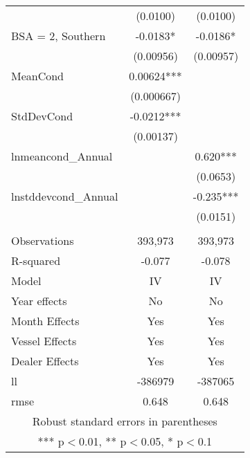 \begin{tabular}{lcc}
 & (0.0100) & (0.0100) \\
BSA = 2, Southern & -0.0183* & -0.0186* \\
 & (0.00956) & (0.00957) \\
MeanCond & 0.00624*** &  \\
 & (0.000667) &  \\
StdDevCond & -0.0212*** &  \\
 & (0.00137) &  \\
lnmeancond\_Annual &  & 0.620*** \\
 &  & (0.0653) \\
lnstddevcond\_Annual &  & -0.235*** \\
 &  & (0.0151) \\
 &  &  \\
Observations & 393,973 & 393,973 \\
R-squared & -0.077 & -0.078 \\
Model & IV & IV \\
Year effects & No & No \\
Month Effects & Yes & Yes \\
Vessel Effects & Yes & Yes \\
Dealer Effects & Yes & Yes \\
ll & -386979 & -387065 \\
 rmse & 0.648 & 0.648 \\ \hline
\multicolumn{3}{c}{ Robust standard errors in parentheses} \\
\multicolumn{3}{c}{ *** p$<$0.01, ** p$<$0.05, * p$<$0.1} \\
\end{tabular}
